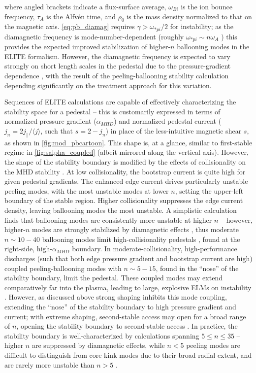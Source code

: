 \noindent where angled brackets indicate a flux-surface average, $\omega_{Bi}$ is the ion bounce frequency, $\tau_A$ is the Alfv\'en time, and $\rho_0$ is the mass density normalized to that on the magnetic axis.  \cref{eq:pb_diamag} requires $\gamma > \omega_{*pi}/2$ for instability; as the diamagnetic frequency is mode-number-dependent (roughly $\omega_{*pi} \sim n\omega_A$ \cite{Snyder2004}) this provides the expected improved stabilization of higher-$n$ ballooning modes in the ELITE formalism.  However, the diamagnetic frequency is expected to vary strongly on short length scales in the pedestal due to the pressure-gradient dependence \cite{Huysmans2005}, with the result of the peeling-ballooning stability calculation depending significantly on the treatment approach for this variation.

Sequences of ELITE calculations are capable of effectively characterizing the stability space for a pedestal -- this is customarily expressed in terms of normalized pressure gradient ($\alpha_{MHD}$) and normalized pedestal current ($j_n = 2j_\parallel/\langle j \rangle$, such that $s = 2 - j_n$) in place of the less-intuitive magnetic shear $s$, as shown in \cref{fig:mod_pbcartoon}.  This shape is, at a glance, similar to first-stable regime in \cref{fig:salpha_coupled} (albeit mirrored along the vertical axis).  However, the shape of the stability boundary is modified by the effects of collisionality on the MHD stability \cite{Snyder2009}.  At low collisionality, the bootstrap current is quite high for given pedestal gradients.  The enhanced edge current drives particularly unstable peeling modes, with the most unstable modes at lower $n$, setting the upper-left boundary of the stable region.    Higher collisionality suppresses the edge current density, leaving ballooning modes the most unstable.  A simplistic calculation finds that ballooning modes are consistently more unstable at higher $n$ -- however, higher-$n$ modes are strongly stabilized by diamagnetic effects \cite{Suttrop2000}, thus moderate $n \sim 10-40$ ballooning modes limit high-collisionality pedestals \cite{Snyder2004}, found at the right-side, high-$\alpha_{MHD}$ boundary.  In moderate-collisionality, high-performance discharges (such that both edge pressure gradient and bootstrap current are high) coupled peeling-ballooning modes with $n \sim 5-15$, found in the ``nose'' of the stability boundary, limit the pedestal.  These coupled modes may extend comparatively far into the plasma, leading to large, explosive ELMs on instability \cite{Wilson2002}.  However, as discussed above strong shaping inhibits this mode coupling, extending the ``nose'' of the stability boundary to high pressure gradient and current; with extreme shaping, second-stable access may open for a broad range of $n$, opening the stability boundary to second-stable access \cite{Turnbull2003}.  In practice, the stability boundary is well-characterized by calculations spanning $5 \le n \le 35$ -- higher $n$ are suppressed by diamagnetic effects, while $n < 5$ peeling modes are difficult to distinguish from core kink modes due to their broad radial extent, and are rarely more unstable than $n > 5$ \cite{Snyder2009}.

